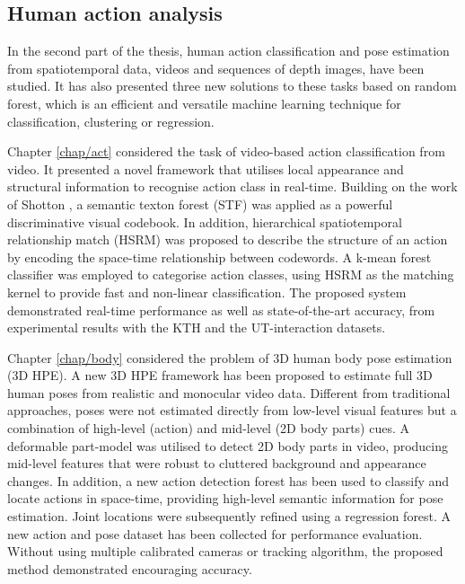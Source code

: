 \subsection{Human action analysis}

In the second part of the thesis, human action classification and pose estimation from spatiotemporal data, \eg videos and sequences of depth images, have been studied. 
It has also presented three new solutions to these tasks based on random forest, which is an efficient and versatile machine learning technique for classification, clustering or regression. 

Chapter \ref{chap/act} considered the task of video-based action classification from video. It presented a novel framework that utilises local appearance and structural information to recognise action class in real-time. Building on the work of Shotton \etal \cite{Shotton2008}, a semantic texton forest (STF) was applied as a powerful discriminative visual codebook. In addition, hierarchical spatiotemporal relationship match (HSRM) was proposed to describe the structure of an action by encoding the space-time relationship between codewords. A k-mean forest classifier was employed to categorise action classes, using HSRM as the matching kernel to provide fast and non-linear classification. 
The proposed system demonstrated real-time performance as well as state-of-the-art accuracy, from experimental results with the KTH and the UT-interaction datasets. 

Chapter \ref{chap/body} considered the problem of 3D human body pose estimation (3D HPE).
A new 3D HPE framework has been proposed to estimate full 3D human poses from realistic and monocular video data. Different from traditional approaches, poses were not estimated directly from low-level visual features but a combination of high-level (action) and mid-level (2D body parts) cues. 
A deformable part-model was utilised to detect 2D body parts in video, producing mid-level features that were robust to cluttered background and appearance changes. In addition, a new action detection forest has been used to classify and locate actions in space-time, providing high-level semantic information for pose estimation. Joint locations were subsequently refined using a regression forest. A new action and pose dataset has been collected for performance evaluation. Without using multiple calibrated cameras or tracking algorithm, the proposed method demonstrated encouraging accuracy.

